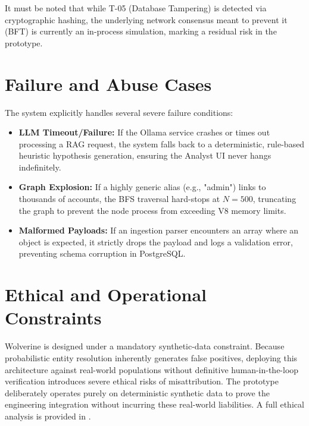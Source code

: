 It must be noted that while T-05 (Database Tampering) is detected via cryptographic hashing, the underlying network consensus meant to prevent it (BFT) is currently an in-process simulation, marking a residual risk in the prototype.

\section{Failure and Abuse Cases}
\label{sec:requirements-failure-cases}
The system explicitly handles several severe failure conditions:
\begin{itemize}
    \item \textbf{LLM Timeout/Failure:} If the Ollama service crashes or times out processing a RAG request, the system falls back to a deterministic, rule-based heuristic hypothesis generation, ensuring the Analyst UI never hangs indefinitely.
    \item \textbf{Graph Explosion:} If a highly generic alias (e.g., "admin") links to thousands of accounts, the BFS traversal hard-stops at $N=500$, truncating the graph to prevent the node process from exceeding V8 memory limits.
    \item \textbf{Malformed Payloads:} If an ingestion parser encounters an array where an object is expected, it strictly drops the payload and logs a validation error, preventing schema corruption in PostgreSQL.
\end{itemize}

\section{Ethical and Operational Constraints}
\label{sec:requirements-ethical}
Wolverine is designed under a mandatory synthetic-data constraint. Because probabilistic entity resolution inherently generates false positives, deploying this architecture against real-world populations without definitive human-in-the-loop verification introduces severe ethical risks of misattribution. The prototype deliberately operates purely on deterministic synthetic data to prove the engineering integration without incurring these real-world liabilities. A full ethical analysis is provided in .
